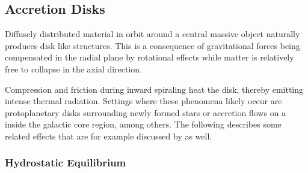 \subsection{Accretion Disks}
\label{sub:accretion}

Diffusely distributed material in orbit around a central massive object naturally produces disk like structures. This is a
consequence of gravitational forces being compensated in the radial plane by rotational effects while matter is relatively
free to collapse in the axial direction. 


\newpage


Compression and friction during inward spiraling heat the disk, thereby emitting intense thermal radiation. Settings where these
phenomena likely occur are protoplanetary disks surrounding newly formed stars or accretion flows on a  inside the galactic
core region, among others. The following describes some related effects that are for example discussed by \cite{Longair_2011} as well.



\subsubsection*{Hydrostatic Equilibrium}

